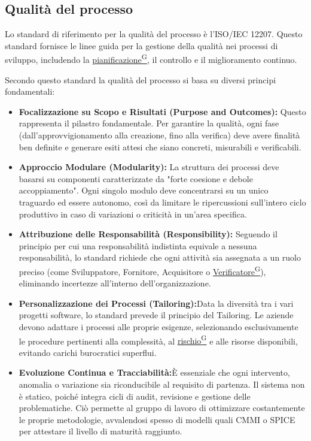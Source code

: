 \documentclass[a4paper,12pt]{article}
\providecommand{\glslink}[2]{\href{https://alittlebyte-19.github.io/Documentazione/glossario.html\#gls-#1}{\underline{#2}\textsuperscript{\scriptsize G}}}
\begin{document}
\subsection{Qualità del processo}
Lo standard di riferimento per la qualità del processo è l'ISO/IEC 12207. Questo standard fornisce le linee guida per la gestione della qualità nei processi di sviluppo, includendo la \glslink{pianificazione}{pianificazione}, il controllo e il miglioramento continuo.

Secondo questo standard la qualità del processo si basa su diversi principi fondamentali:
\begin{itemize}
    \item \textbf{Focalizzazione su Scopo e Risultati (Purpose and Outcomes):} Questo rappresenta il pilastro fondamentale. Per garantire la qualità, ogni fase (dall'approvvigionamento alla creazione, fino alla verifica) deve avere finalità ben definite e generare esiti attesi che siano concreti, misurabili e verificabili.
    \item \textbf{Approccio Modulare (Modularity):} La struttura dei processi deve basarsi su componenti caratterizzate da "forte coesione e debole accoppiamento". Ogni singolo modulo deve concentrarsi su un unico traguardo ed essere autonomo, così da limitare le ripercussioni sull'intero ciclo produttivo in caso di variazioni o criticità in un'area specifica.
    \item \textbf{Attribuzione delle Responsabilità (Responsibility):} Seguendo il principio per cui una responsabilità indistinta equivale a nessuna responsabilità, lo standard richiede che ogni attività sia assegnata a un ruolo preciso (come Sviluppatore, Fornitore, Acquisitore o \glslink{verificatore}{Verificatore}), eliminando incertezze all'interno dell'organizzazione.
    \item \textbf{Personalizzazione dei Processi (Tailoring):}Data la diversità tra i vari progetti software, lo standard prevede il principio del Tailoring. Le aziende devono adattare i processi alle proprie esigenze, selezionando esclusivamente le procedure pertinenti alla complessità, al \glslink{rischio}{rischio} e alle risorse disponibili, evitando carichi burocratici superflui.
    \item \textbf{Evoluzione Continua e Tracciabilità:}È essenziale che ogni intervento, anomalia o variazione sia riconducibile al requisito di partenza. Il sistema non è statico, poiché integra cicli di audit, revisione e gestione delle problematiche. Ciò permette al gruppo di lavoro di ottimizzare costantemente le proprie metodologie, avvalendosi spesso di modelli quali CMMI o SPICE per attestare il livello di maturità raggiunto.
\end{itemize}
\end{document}
